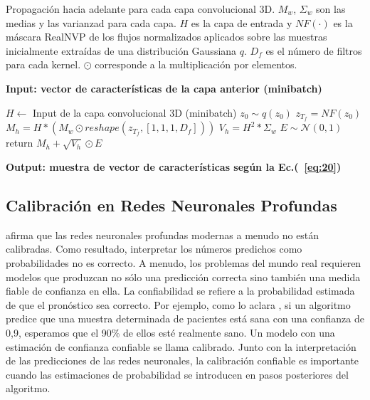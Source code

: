 \documentclass[10pt, oneside, a4paper]{article}
\begin{document}
	\begin{algorithm}[H]
		\caption{Propagación hacia adelante para cada capa convolucional 3D. $M_{w}$, $\Sigma_{w}$ son las medias y las varianzad para cada capa. $H$ es la capa de entrada y $NF(\cdot)$ es la máscara RealNVP de los flujos normalizados aplicados sobre las muestras inicialmente extraídas de una distribución Gaussiana $q$. $D_{f}$ es el número de filtros para cada kernel. $\odot$ corresponde a la multiplicación por elementos.} \label{alg:cap}
		
		\hspace*{\algorithmicindent} \textbf{Input: vector de características de la capa anterior (minibatch)}
		\begin{algorithmic}
			\State $H \gets $ Input de la capa convolucional 3D (minibatch)
			\State $z_{0} \sim q(z_{0})$
			\State $z_{T_{f}} = NF(z_{0})$
			\State $M_{h} = H * (M_{w} \odot reshape(z_{T_{f}}, \left[1, 1, 1, D_{f} \right] )) $
			\State $V_{h} = H^{2} * \Sigma_{w} $
			\State $E \sim \mathcal{N}(0,1) $
			\State return $M_{h} + \sqrt{V_{h}} \odot E$
			
			
		\end{algorithmic}
		\hspace*{\algorithmicindent} \textbf{Output: muestra de vector de características según la Ec.(~\ref{eq:20})} 
	\end{algorithm}

	
	\subsection{Calibración en Redes Neuronales Profundas} \label{calibracion_nn}
	
	\cite{guo2017calibration} afirma que las redes neuronales profundas modernas a menudo no están calibradas. Como resultado, interpretar los números predichos como probabilidades no es correcto. A menudo, los problemas del mundo real requieren modelos que produzcan no sólo una predicción correcta sino también una medida fiable de confianza en ella. La confiabilidad se refiere a la probabilidad estimada de que el pronóstico sea correcto. Por ejemplo, como lo aclara \cite{vasilev2023calibration}, si un algoritmo predice que una muestra determinada de pacientes está sana con una confianza de 0,9, esperamos que el 90\% de ellos esté realmente sano. Un modelo con una estimación de confianza confiable se llama calibrado. Junto con la interpretación de las predicciones de las redes neuronales, la calibración confiable es importante cuando las estimaciones de probabilidad se introducen en pasos posteriores del algoritmo.
	
\end{document}
